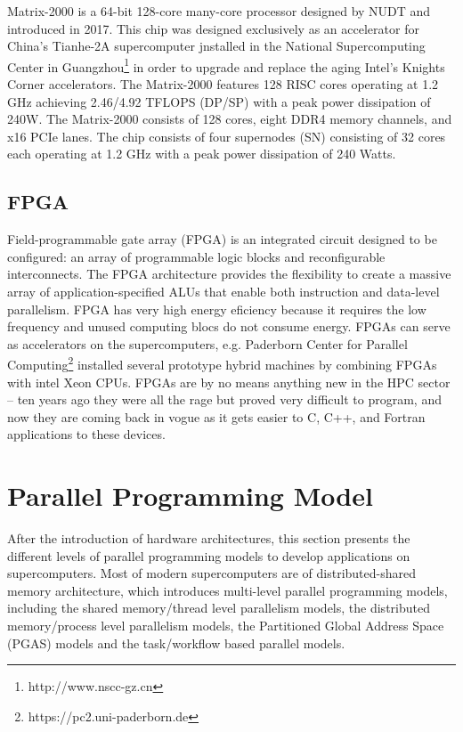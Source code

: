 Matrix-2000 \cite{matrix-2000} is a 64-bit 128-core many-core processor designed by NUDT and introduced in 2017. This chip was designed exclusively as an accelerator for China's Tianhe-2A supercomputer jnstalled in the National Supercomputing Center in Guangzhou\footnote{http://www.nscc-gz.cn} in order to upgrade and replace the aging Intel's Knights Corner accelerators. The Matrix-2000 features 128 RISC cores operating at 1.2 GHz achieving 2.46/4.92 TFLOPS (DP/SP) with a peak power dissipation of 240W. The Matrix-2000 consists of 128 cores, eight DDR4 memory channels, and x16 PCIe lanes. The chip consists of four supernodes (SN) consisting of 32 cores each operating at 1.2 GHz with a peak power dissipation of 240 Watts.

\subsection{FPGA}

Field-programmable gate array (FPGA) is an integrated circuit designed to be configured: an array of programmable logic blocks and reconfigurable interconnects. The FPGA architecture provides the flexibility to create a massive array of application-specified ALUs that enable both instruction and data-level parallelism. FPGA has very high energy eficiency because it requires the low frequency and unused computing blocs do not consume energy. FPGAs can serve as accelerators on the supercomputers, e.g. Paderborn Center for Parallel Computing\footnote{https://pc2.uni-paderborn.de} installed several prototype hybrid machines by combining FPGAs with intel Xeon CPUs. FPGAs are by no means anything new in the HPC sector – ten years ago they were all the rage but proved very difficult to program, and now they are coming back in vogue as it gets easier to C, C++, and Fortran applications to these devices.


\section{Parallel Programming Model}\label{Parallel Programming Model}

After the introduction of hardware architectures, this section presents the different levels of parallel programming models to develop applications on supercomputers. Most of modern supercomputers are of distributed-shared memory architecture, which introduces multi-level parallel programming models, including the shared memory/thread level parallelism models, the distributed memory/process level parallelism models, the Partitioned Global Address Space (PGAS) models and the task/workflow based parallel models.

